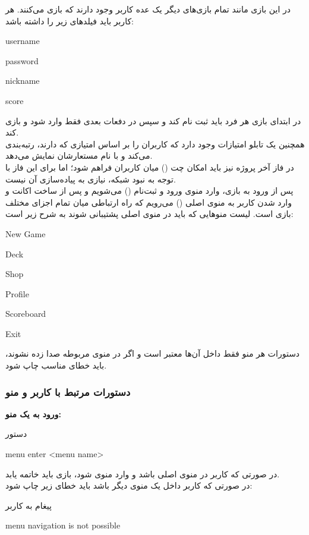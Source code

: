 \documentclass[]{article}
\begin{document}
در این بازی مانند تمام بازی‌های دیگر یک عده کاربر وجود دارند که بازی می‌کنند. 
هر کاربر باید فیلد‌های زیر را داشته باشد:
\begin{itemize}[label=$\blacksquare$]
	\begin{latin}
		\item username
		\item password
		\item nickname
		\item score
	\end{latin}
\end{itemize}
در ابتدای بازی هر فرد باید ثبت نام کند و سپس در دفعات بعدی فقط وارد شود و 
بازی کند.
\\
همچنین یک تابلو امتیازات وجود دارد که کاربران را بر اساس امتیازی که دارند، 
رتبه‌بندی می‌کند و با نام مستعارشان نمایش می‌دهد.
\\
در فاز‌ آخر پروژه نیز باید امکان چت () میان کاربران فراهم 
شود؛ اما برای این فاز با توجه به نبود شبکه، نیازی به پیاده‌سازی آن نیست.
\\
پس از ورود به بازی، وارد منوی ورود و ثبت‌نام () می‌شویم و پس از 
ساخت اکانت و وارد شدن کاربر به منوی اصلی () می‌رویم که راه 
ارتباطی میان تمام اجزای مختلف بازی است. لیست منو‌هایی که باید در منوی اصلی 
پشتیبانی شوند به شرح زیر است:

\begin{itemize}[label=$\blacksquare$]
	\begin{latin}
		\item New Game
		\item Deck
		\item Shop
		\item Profile
		\item Scoreboard
		\item Exit
	\end{latin}
\end{itemize}
دستورات هر منو فقط داخل آن‌ها معتبر است و اگر در منوی مربوطه صدا زده نشوند، 
باید خطای مناسب چاپ شود.

\subsubsection*{{\titr دستورات مرتبط با کاربر و منو}}
\vspace{.5cm}
\textbf{ورود به یک منو:}
\begin{mybox}[colback=yellow]{دستور}
	\begin{latin}	
		menu enter <menu name>
	\end{latin}
\end{mybox}
در صورتی که کاربر در منوی اصلی باشد و وارد منوی  شود، بازی باید 
خاتمه یابد.
\\
در صورتی که کاربر داخل یک منوی دیگر باشد باید خطای زیر چاپ شود:
\\
\begin{mybox}[colback=yellow]{پیغام به کاربر}
	\begin{latin}	
		menu navigation is not possible
	\end{latin}
\end{mybox}
\end{document}

